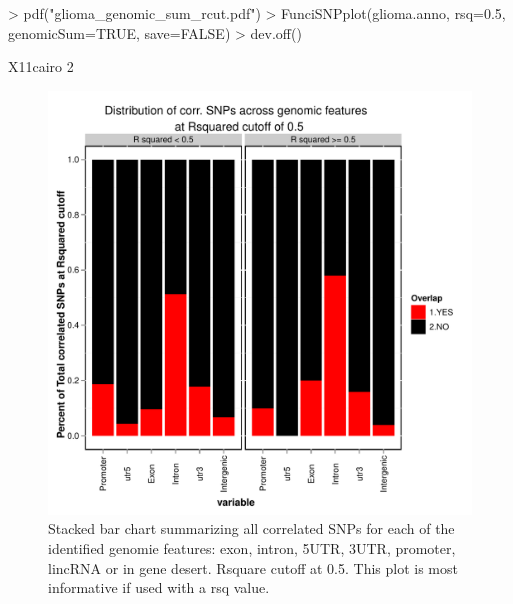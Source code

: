 \documentclass[12pt,fullpage]{article}
\begin{document}
\begin{Schunk}
\begin{Sinput}
> pdf("glioma_genomic_sum_rcut.pdf")                                               
> FunciSNPplot(glioma.anno, rsq=0.5, genomicSum=TRUE, save=FALSE)                  
> dev.off()                                                                        
\end{Sinput}
\begin{Soutput}
X11cairo 
       2 
\end{Soutput}
\end{Schunk}
                                                                                 
\begin{figure}[ht!]                                                              
\begin{center}                                                                   
\includegraphics{glioma_genomic_sum_rcut.pdf}                                    
\caption{\label{fig:glioma_genomic_sum_rcut.pdf} Stacked bar chart summarizing   
    all correlated SNPs for each of the identified genomie features: exon,
        intron,   
        5UTR, 3UTR, promoter, lincRNA or in gene desert. Rsquare cutoff                  
             at 0.5. This plot is most informative if used with a rsq value.}                
{\footnotesize{}}                                                                
\end{center}                                                                     
\end{figure}                                                                     
                                                                                 
\end{document}
